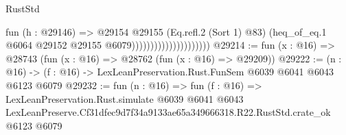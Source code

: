 \begin{lexlean}{RustStd}
\begin{coremodule}
                                          fun (h : @29146) =>
                                          @29154
                                            @29155
                                            (Eq.refl.{2} (Sort 1) @83)
                                            (heq_of_eq.{1}
                                              @6064
                                              @29152
                                              @29155
                                              @6079)))))))))))))))))))))
@29214 := fun (x : @16) => @28743 (fun (x : @16) => @28762 (fun (x : @16) => @29209))
@29222 := (n : @16) -> (f : @16) -> LexLeanPreservation.Rust.FunSem @6039 @6041 @6043 @6123 @6079
@29232 := fun (n : @16) =>
  fun (f : @16) =>
  LexLeanPreservation.Rust.simulate
    @6039
    @6041
    @6043
    LexLeanPreserve.Cf31dfec9d7f34a9133ae65a349666318.R22.RustStd.crate_ok
    @6123
    @6079
\end{coremodule}
\end{lexlean}
